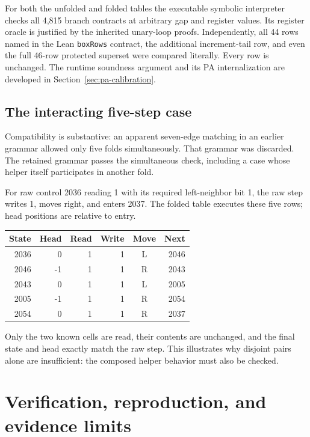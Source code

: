 \documentclass[11pt,letterpaper]{article}
\newcommand{\code}[1]{\texttt{#1}}
\begin{document}
For both the unfolded and folded tables the executable symbolic
interpreter checks all 4,815 branch contracts at arbitrary gap and
register values. Its register oracle is justified by the inherited
unary-loop proofs. Independently, all 44 rows named in the Lean
\code{boxRows} contract, the additional increment-tail row, and even
the full 46-row protected superset were compared literally.
Every row is unchanged. The runtime soundness argument and its
PA internalization are developed in Section~\ref{sec:pa-calibration}.



\subsection{The interacting five-step case}
Compatibility is substantive: an apparent seven-edge matching in an
earlier grammar allowed only five folds simultaneously. That grammar was
discarded. The retained grammar passes the simultaneous check, including
a case whose helper itself participates in another fold.

For raw control 2036 reading 1 with its required left-neighbor bit 1,
the raw step writes 1, moves right, and enters 2037. The folded table
executes these five rows; head positions are relative to entry.
\begin{center}\small
\begin{tabular}{@{}rrrrcr@{}}
\toprule
State & Head & Read & Write & Move & Next\\
\midrule
2036 & 0 & 1 & 1 & L & 2046\\
2046 & -1 & 1 & 1 & R & 2043\\
2043 & 0 & 1 & 1 & L & 2005\\
2005 & -1 & 1 & 1 & R & 2054\\
2054 & 0 & 1 & 1 & R & 2037\\
\bottomrule
\end{tabular}
\end{center}
Only the two known cells are read, their contents are unchanged, and
the final state and head exactly match the raw step. This illustrates
why disjoint pairs alone are insufficient: the composed helper behavior
must also be checked.



\section{Verification, reproduction, and evidence limits}
\label{sec:verification}
\end{document}
